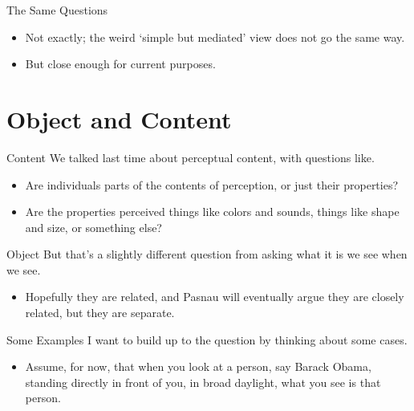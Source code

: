 \documentclass[
  17pt,
  letterpaper,
  ignorenonframetext,
  aspectratio=169,
]{beamer}
\providecommand{\tightlist}{%
  \setlength{\itemsep}{0pt}\setlength{\parskip}{0pt}}\usepackage{longtable,booktabs,array}
\begin{document}
\begin{frame}{The Same Questions}
\protect\hypertarget{the-same-questions}{}
\begin{itemize}[<+->]
\tightlist
\item
  Not exactly; the weird `simple but mediated' view does not go the same
  way.
\item
  But close enough for current purposes.
\end{itemize}
\end{frame}

\hypertarget{object-and-content}{%
\section{Object and Content}\label{object-and-content}}

\begin{frame}{Content}
\protect\hypertarget{content}{}
We talked last time about perceptual content, with questions like.

\begin{itemize}[<+->]
\tightlist
\item
  Are individuals parts of the contents of perception, or just their
  properties?
\item
  Are the properties perceived things like colors and sounds, things
  like shape and size, or something else?
\end{itemize}
\end{frame}

\begin{frame}{Object}
\protect\hypertarget{object}{}
But that's a slightly different question from asking what it is we see
when we see.

\begin{itemize}[<+->]
\tightlist
\item
  Hopefully they are related, and Pasnau will eventually argue they are
  closely related, but they are separate.
\end{itemize}
\end{frame}

\begin{frame}{Some Examples}
\protect\hypertarget{some-examples}{}
I want to build up to the question by thinking about some cases.

\begin{itemize}[<+->]
\tightlist
\item
  Assume, for now, that when you look at a person, say Barack Obama,
  standing directly in front of you, in broad daylight, what you see is
  that person.
\end{itemize}
\end{frame}
\end{document}
